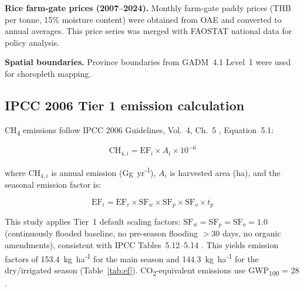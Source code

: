 \documentclass[fleqn,10pt]{olplainarticle}
\begin{document}
\textbf{Rice farm-gate prices (2007--2024).}
Monthly farm-gate paddy prices (THB per tonne, 15\% moisture content) were
obtained from OAE \citep{oae2024} and converted to annual averages.
This price series was merged with FAOSTAT national data for policy analysis.

\textbf{Spatial boundaries.}
Province boundaries from GADM~4.1 Level~1 \citep{gadm2024} were used for
choropleth mapping.

\subsection*{IPCC 2006 Tier 1 emission calculation}

CH\textsubscript{4} emissions follow IPCC 2006 Guidelines, Vol.~4, Ch.~5
\citep{ipcc2006}, Equation~5.1:

\begin{equation}
  \text{CH}_{4,i} = \text{EF}_i \times A_i \times 10^{-6}
  \label{eq:ch4}
\end{equation}

\noindent where $\text{CH}_{4,i}$ is annual emission (Gg~yr\textsuperscript{-1}),
$A_i$ is harvested area (ha), and the seasonal emission factor is:

\begin{equation}
  \text{EF}_i = \text{EF}_c \times \text{SF}_{w} \times \text{SF}_{p}
               \times \text{SF}_{o} \times t_{p}
  \label{eq:ef}
\end{equation}

This study applies Tier~1 default scaling factors: $\text{SF}_w = \text{SF}_p
= \text{SF}_o = 1.0$ (continuously flooded baseline, no pre-season flooding
$>$30 days, no organic amendments), consistent with IPCC Tables~5.12--5.14
\citep{ipcc2006}.
This yields emission factors of 153.4~kg~ha\textsuperscript{-1} for the main season
and 144.3~kg~ha\textsuperscript{-1} for the dry/irrigated season (Table~\ref{tab:ef}).
CO\textsubscript{2}-equivalent emissions use GWP\textsubscript{100} = 28
\citep{myhre2013}.
\end{document}

